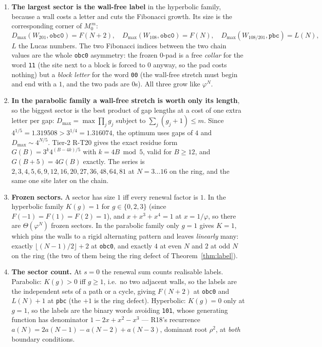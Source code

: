 \documentclass[11pt]{article}
\newcommand{\rt}[1]{\texttt{#1}}
\theoremstyle{plain}
\theoremstyle{remark}
\begin{document}
\begin{enumerate}
\item \textbf{The largest sector is the wall-free label} in the hyperbolic
family, because a wall costs a letter and cuts the Fibonacci growth. Its size is
the corresponding corner of $M_0^{\,m}$:
\[
D_{\max}(W_{201},\rt{obc0}) = F(N+2), \quad
D_{\max}(W_{108},\rt{obc0}) = F(N), \quad
D_{\max}(W_{108/201},\rt{pbc}) = L(N),
\]
$L$ the Lucas numbers. The two Fibonacci indices between the two chain values are
the whole \rt{obc0} asymmetry: the frozen $0$-pad is a free \emph{collar} for the
word \rt{11} (the site next to a block is forced to $0$ anyway, so the pad costs
nothing) but a \emph{block letter} for the word \rt{00} (the wall-free stretch
must begin and end with a $1$, and the two pads are $0$s). All three grow like
$\varphi^N$.

\item \textbf{In the parabolic family a wall-free stretch is worth only its
length}, so the biggest sector is the best product of gap lengths at a cost of
one extra letter per gap:
$D_{\max} = \max \prod_j g_j$ subject to $\sum_j (g_j+1) \le m$. Since
$4^{1/5}=1.319508 > 3^{1/4}=1.316074$, the optimum uses gaps of $4$ and
$D_{\max}\sim 4^{N/5}$. Tier-2 R-T20 gives the exact residue form
$G(B)=3^k4^{(B-4k)/5}$ with $k=4B \bmod 5$, valid for $B\ge12$, and
$G(B+5)=4G(B)$ exactly. The series is
$2,3,4,5,6,9,12,16,20,27,36,48,64,81$ at $N=3\ldots16$ on the ring, and the same
one site later on the chain.

\item \textbf{Frozen sectors.} A sector has size $1$ iff every renewal factor is
$1$. In the hyperbolic family $K(g)=1$ for $g\in\{0,2,3\}$ (since
$F(-1)=F(1)=F(2)=1$), and $x+x^3+x^4=1$ at $x=1/\varphi$, so there are
$\Theta(\varphi^N)$ frozen sectors. In the parabolic family only $g=1$ gives
$K=1$, which pins the walls to a rigid alternating pattern and leaves
\emph{linearly} many: exactly $\lfloor (N-1)/2\rfloor+2$ at \rt{obc0}, and
exactly $4$ at even $N$ and $2$ at odd $N$ on the ring (the two of them being the
ring defect of Theorem~\ref{thm:label}).

\item \textbf{The sector count.} At $s=0$ the renewal sum counts realisable
labels. Parabolic: $K(g)>0$ iff $g\ge1$, i.e.\ no two adjacent walls, so the
labels are the independent sets of a path or a cycle, giving $F(N+2)$ at
\rt{obc0} and $L(N)+1$ at \rt{pbc} (the $+1$ is the ring defect). Hyperbolic:
$K(g)=0$ only at $g=1$, so the labels are the binary words avoiding \rt{101},
whose generating function has denominator $1-2x+x^2-x^3$ --- R18's recurrence
$a(N)=2a(N-1)-a(N-2)+a(N-3)$, dominant root $\rho^2$, at \emph{both} boundary
conditions.


\end{enumerate}
\end{document}
